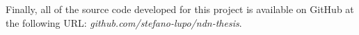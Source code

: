 \documentclass[journal]{IEEEtran}
\begin{document}
Finally, all of the source code developed for this project is available on GitHub at the following URL: \textit{github.com/stefano-lupo/ndn-thesis}.








\vfill{}


\end{document}
